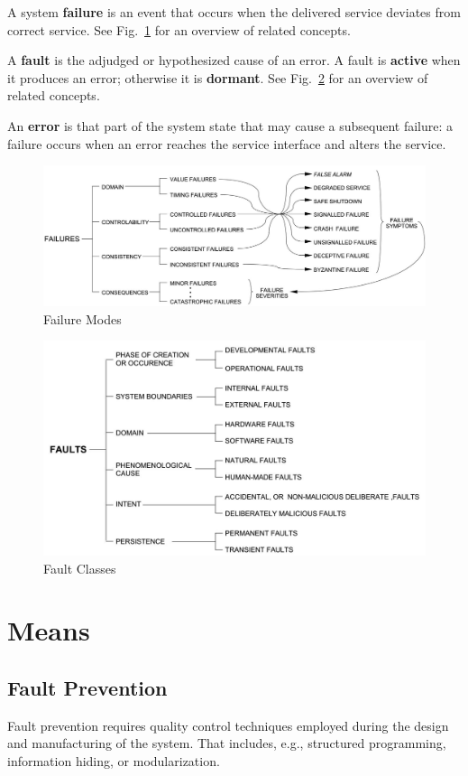 A system \textbf{failure} is an event that occurs when the delivered service deviates from correct service.
See Fig.~\ref{fig:concepts_fail} for an overview of related concepts.

A \textbf{fault} is the adjudged or hypothesized cause of an error.
A fault is \textbf{active} when it produces an error; otherwise it is \textbf{dormant}.
See Fig.~\ref{fig:concepts_fault} for an overview of related concepts.

An \textbf{error} is that part of the system state that may cause a subsequent failure: a failure occurs when an error reaches the service interface and alters the service.

\begin{figure}
\centering
\includegraphics[width=0.7\linewidth]{concepts_fail}
\caption{Failure Modes}
\label{fig:concepts_fail}
\end{figure}

\begin{figure}
\centering
\includegraphics[width=0.7\linewidth]{concepts_fault}
\caption{Fault Classes}
\label{fig:concepts_fault}
\end{figure}

\section{Means}

\subsection{Fault Prevention}

Fault prevention requires quality control techniques employed during the design and manufacturing of the system.
That includes, e.g., structured programming, information hiding, or modularization.

